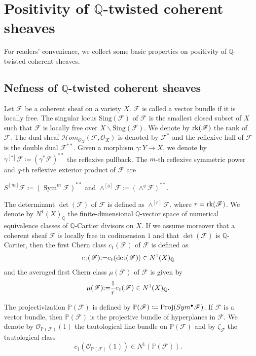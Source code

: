 \documentclass[english,reqno]{amsart}
\newcommand\bbP{{\mathbb P}}
\newcommand\bbQ{{\mathbb Q}}
\newcommand\sF{{\mathscr F}}
\newcommand\sO{{\mathscr O}}
\newcommand{\rk}{{\rm rk}}
\DeclareMathOperator*{\Sym}{Sym}
\newcommand{\Proj}[1]{\ensuremath{\mbox{\rm Proj}(#1)}}
\newcommand{\sHom}[2]{\ensuremath{\mathscr{H}om_{\mathscr{O}_X}(#1,#2)}}
\newcommand{\defeq}{{\vcentcolon=}}
\theoremstyle{plain}
\theoremstyle{definition}
\numberwithin{equation}{section} %
\begin{document}
\baselineskip






\section{Positivity of $\bbQ$-twisted coherent sheaves}


\label{section:Q-twisted}

 For readers' convenience, we collect some basic properties on positivity of $\bbQ$-twisted coherent sheaves.



\subsection{Nefness of $\bbQ$-twisted coherent sheaves}
Let $\sF$ be a coherent sheaf on a  variety $X$.  $\sF$ is called a vector bundle if it is locally free.
The singular locus $\mathrm{Sing}(\sF)$ of $\sF$ is the smallest closed subset of $X$ such that $\sF$ is locally free over $X\backslash \mathrm{Sing}(\sF)$.  We denote by $\rk(\sF)$ the rank of $\sF$.
The dual sheaf $\sHom{\sF}{\sO_X}$ is denoted by $\sF^*$ and the reflexive hull of $\sF$ is the double dual $\sF^{**}$.
Given a morphism $\gamma\colon Y\rightarrow X$, we denote by $\gamma^{[*]}\sF\coloneqq (\gamma^*\sF)^{**}$ the reflexive pullback.  The $m$-th reflexive symmetric power and $q$-th reflexive exterior product of $\sF$ are
\begin{center}
    $S^{[m]}\sF\coloneqq(\Sym^m\sF)^{**}$ and $\wedge^{[q]}\sF\coloneqq (\wedge^q\sF)^{**}$.
\end{center}
The determinant $\det(\sF)$ of $\sF$ is defined as $\wedge^{[r]}\sF$, where $r=\rk(\sF)$. We denote by $N^1(X)_{\bbQ}$ the finite-dimensional $\bbQ$-vector space of numerical equivalence classes of $\bbQ$-Cartier divisors on $X$. If we assume moreover that a coherent sheaf $\sF$ is locally free in codimension $1$ and that $\det(\sF)$ is $\bbQ$-Cartier, then   the first Chern class $c_1(\sF)$ of $\sF$ is defined as
\[
c_1(\sF)\defeq c_1(\det(\sF))\in N^1(X)_{\bbQ}
\]
and the averaged first Chern class $\mu(\sF)$ of $\sF$ is given  by
\[
\mu(\sF) \defeq \frac{1}{r}c_1(\sF)\in N^1(X)_{\bbQ}.
\]


\noindent
The projectivization $\bbP(\sF)$ is defined by $\bbP(\sF)\coloneqq \Proj{Sym^{\bullet}\sF}$.  If $\sF$ is a vector bundle, then $\mathbb{P}(\sF)$ is the projective bundle of hyperplanes in $\sF$.    We denote by $\sO_{\bbP(\sF)}(1)$ the tautological line bundle on $\bbP(\sF)$  and   by $\zeta_{\sF}$ the tautological class
\[c_1(\sO_{\bbP(\sF)}(1))\in N^1(\bbP(\sF)).\]
\end{document}
